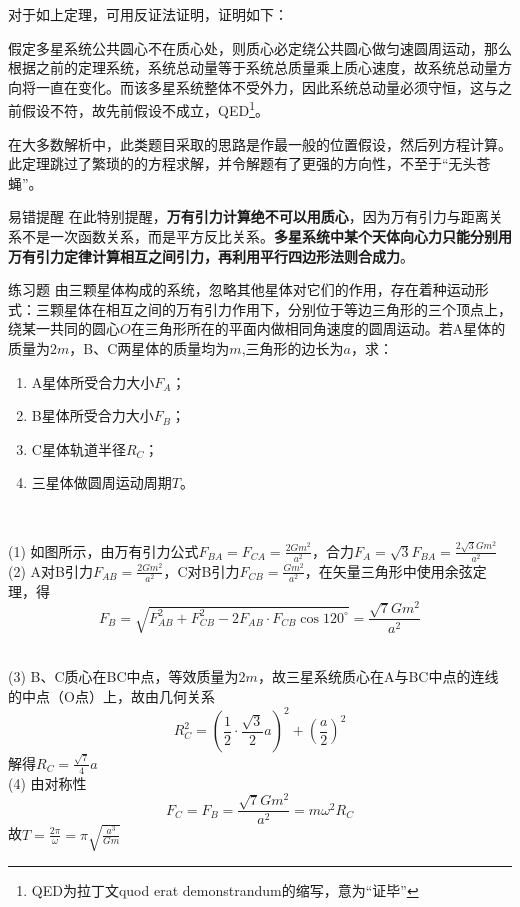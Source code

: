 对于如上定理，可用反证法证明，证明如下：

假定多星系统公共圆心不在质心处，则质心必定绕公共圆心做匀速圆周运动，那么根据之前的定理系统，系统总动量等于系统总质量乘上质心速度，故系统总动量方向将一直在变化。而该多星系统整体不受外力，因此系统总动量必须守恒，这与之前假设不符，故先前假设不成立，QED\footnote{QED为拉丁文quod erat demonstrandum的缩写，意为“证毕”}。

在大多数解析中，此类题目采取的思路是作最一般的位置假设，然后列方程计算。此定理跳过了繁琐的的方程求解，并令解题有了更强的方向性，不至于“无头苍蝇”。

\begin{mk}{易错提醒}{}
在此特别提醒，\textbf{万有引力计算绝不可以用质心}，因为万有引力与距离关系不是一次函数关系，而是平方反比关系。\textbf{多星系统中某个天体向心力只能分别用万有引力定律计算相互之间引力，再利用平行四边形法则合成力}。
\end{mk}

\begin{ep}{练习题}{}
由三颗星体构成的系统，忽略其他星体对它们的作用，存在着种运动形式：三颗星体在相互之间的万有引力作用下，分别位于等边三角形的三个顶点上，绕某一共同的圆心$O$在三角形所在的平面内做相同角速度的圆周运动。若A星体的质量为$2m$，B、C两星体的质量均为$m$,三角形的边长为$a$，求：

\begin{enumerate}[label=(\arabic*)]
  \item A星体所受合力大小$F_A$；
  \item B星体所受合力大小$F_B$；
  \item C星体轨道半径$R_C$；
  \item 三星体做圆周运动周期$T$。
\end{enumerate}
~\\

\begin{minipage}[b]{0.65\linewidth}
(1) 如图所示，由万有引力公式$F_{BA}=F_{CA}=\frac{2 G m^2}{a^2}$，合力$F_A = \sqrt{3} F_{BA} = \frac{2\sqrt{3} G m^2}{a^2}$
~\\

(2) A对B引力$F_{AB}=\frac{2 G m^2}{a^2}$，C对B引力$F_{CB}=\frac{G m^2}{a^2}$，在矢量三角形中使用余弦定理，得
$$F_B = \sqrt{F_{AB}^2+F_{CB}^2-2F_{AB} \cdot F_{CB} \cos{120^{\circ}}}=\frac{\sqrt{7}G m^2}{a^2}$$
\end{minipage}
\hfill
\begin{minipage}[b]{0.35\linewidth}

\end{minipage}
~\\

(3) B、C质心在BC中点，等效质量为$2m$，故三星系统质心在A与BC中点的连线的中点（O点）上，故由几何关系
$$R_C^2 = (\frac{1}{2} \cdot \frac{\sqrt{3}}{2} a)^2+(\frac{a}{2})^2$$
解得$R_C = \frac{\sqrt{7}}{4} a$
~\\

(4) 由对称性
$$F_C = F_B = \frac{\sqrt{7}G m^2}{a^2} = m \omega ^2 R_C$$
故$T=\frac{2 \pi}{\omega}=\pi \sqrt{\frac{a^3}{G m}}$

\end{ep}

